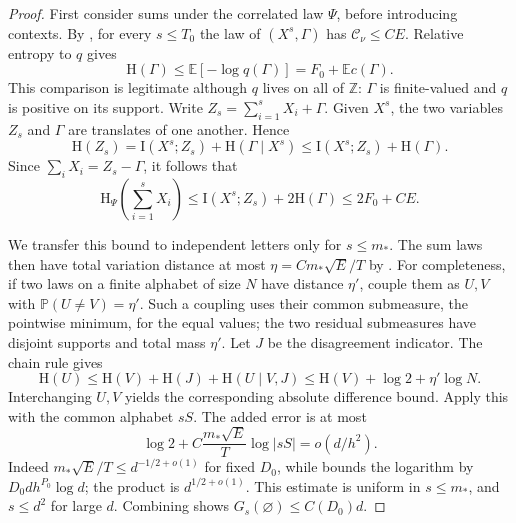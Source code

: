 \begin{proof}
First consider sums under the correlated law $\Psi$, before introducing
contexts.  By , for every $s\le T_0$
the law of $(X^s,\Gamma)$ has $\mathcal C_\nu\le CE$.  Relative entropy
to $q$ gives
\begin{equation}
\label{entropy-foundations:error-entropy}
 \mathrm H(\Gamma)\le\mathbb E[-\log q(\Gamma)]
       =F_0+\mathbb E c(\Gamma).
\end{equation}
This comparison is legitimate although $q$ lives on all of $\mathbb Z$:
$\Gamma$ is finite-valued and $q$ is positive on its support.  Write
$Z_s=\sum_{i=1}^sX_i+\Gamma$.  Given $X^s$, the two variables $Z_s$ and
$\Gamma$ are translates of one another.  Hence
\[
 \mathrm H(Z_s)=\mathrm I(X^s;Z_s)+\mathrm H(\Gamma\mid X^s)
      \le\mathrm I(X^s;Z_s)+\mathrm H(\Gamma).
\]
Since $\sum_iX_i=Z_s-\Gamma$, it follows that
\begin{equation}
\label{entropy-foundations:correlated-sum-entropy}
 \mathrm H_\Psi\!\left(\sum_{i=1}^sX_i\right)
 \le\mathrm I(X^s;Z_s)+2\mathrm H(\Gamma)
 \le 2F_0+CE.
\end{equation}

We transfer this bound to independent letters only for $s\le m_*$.  The
sum laws then have total variation distance at most
$\eta=Cm_*\sqrt E/T$ by .  For completeness, if two
laws on a finite alphabet of size $N$ have distance $\eta'$, couple them
as $U,V$ with $\mathbb P(U\ne V)=\eta'$.  Such a coupling uses their common
submeasure, the pointwise minimum, for the equal values; the two residual
submeasures have disjoint supports and total mass $\eta'$.  Let $J$ be the
disagreement indicator.  The chain rule gives
\[
 \mathrm H(U)\le\mathrm H(V)+\mathrm H(J)+\mathrm H(U\mid V,J)
           \le\mathrm H(V)+\log2+\eta'\log N.
\]
Interchanging $U,V$ yields the corresponding absolute difference bound.
Apply this with the common alphabet $sS$.  The added error is at most
\begin{equation}
\label{entropy-foundations:continuity-error}
 \log2+C\frac{m_*\sqrt E}{T}\log|sS|=o(d/h^2).
\end{equation}
Indeed $m_*\sqrt E/T\le d^{-1/2+o(1)}$ for fixed $D_0$, while
 bounds the logarithm by
$D_0d h^{P_0}\log d$; the product is $d^{1/2+o(1)}$.  This estimate is
uniform in $s\le m_*$, and $s\le d^2$ for large $d$.
Combining 
shows $G_s(\varnothing)\le C(D_0)d$.


\end{proof}
